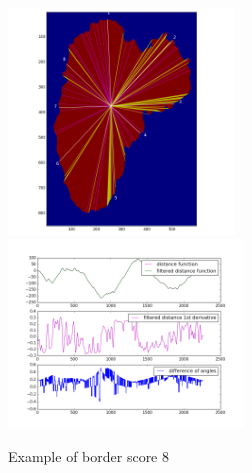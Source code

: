 \begin{figure}[H]
    \includegraphics[height=6cm,keepaspectratio]{assets/border/examples/border_8/border.png}
    \includegraphics[height=5cm,keepaspectratio]{assets/border/examples/border_8/figure_1.png}
    \caption{Example of border score 8}
    \label{fig:border_8}
\end{figure}


